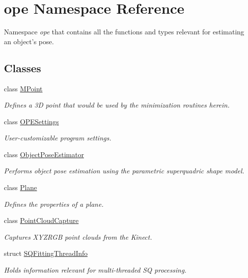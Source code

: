 \hypertarget{namespaceope}{\section{ope Namespace Reference}
\label{namespaceope}
}


Namespace {\itshape ope} that contains all the functions and types relevant for estimating an object's pose.  


\subsection*{Classes}
\begin{DoxyCompactItemize}
\item 
class \hyperlink{classope_1_1_m_point}{M\-Point}
\begin{DoxyCompactList}\small\item\em Defines a 3\-D point that would be used by the minimization routines herein. \end{DoxyCompactList}\item 
class \hyperlink{classope_1_1_o_p_e_settings}{O\-P\-E\-Settings}
\begin{DoxyCompactList}\small\item\em User-\/customizable program settings. \end{DoxyCompactList}\item 
class \hyperlink{classope_1_1_object_pose_estimator}{Object\-Pose\-Estimator}
\begin{DoxyCompactList}\small\item\em Performs object pose estimation using the parametric superquadric shape model. \end{DoxyCompactList}\item 
class \hyperlink{classope_1_1_plane}{Plane}
\begin{DoxyCompactList}\small\item\em Defines the properties of a plane. \end{DoxyCompactList}\item 
class \hyperlink{classope_1_1_point_cloud_capture}{Point\-Cloud\-Capture}
\begin{DoxyCompactList}\small\item\em Captures X\-Y\-Z\-R\-G\-B point clouds from the Kinect. \end{DoxyCompactList}\item 
struct \hyperlink{structope_1_1_s_q_fitting_thread_info}{S\-Q\-Fitting\-Thread\-Info}
\begin{DoxyCompactList}\small\item\em Holds information relevant for multi-\/threaded S\-Q processing. \end{DoxyCompactList}\item 

\end{DoxyCompactItemize}
